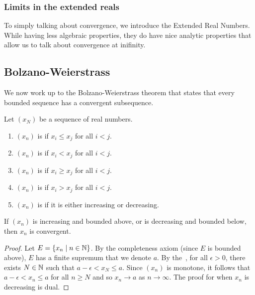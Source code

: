 \subsubsection{Limits in the extended reals}\label{sec:real-analysis:limits-extend-reals}
To simply talking about convergence, we introduce the Extended Real Numbers. While having less algebraic properties, they do have nice analytic properties that allow us to talk about convergence at inifinity.



\subsection{Bolzano-Weierstrass}\label{sec:real-analysis:bolzano-weierstrass}
We now work up to the Bolzano-Weierstrass theorem that states that every bounded sequence has a convergent subsequence.

\begin{definition}
  Let \((x_{N})\) be a sequence of real numbers.
  \begin{enumerate}
  \item \((x_{n})\) is  if \(x_{i} \leq x_{j}\) for all \(i < j\).
  \item \((x_{n})\) is  if \(x_{i} < x_{j}\) for all \(i < j\).
  \item \((x_{n})\) is  if \(x_{i} \geq x_{j}\) for all \(i < j\).
  \item \((x_{n})\) is  if \(x_{i} > x_{j}\) for all \(i < j\).
  \item \((x_{n})\) is  if it is either increasing or decreasing.
  \end{enumerate}
\end{definition}

\begin{theorem}\label{thm:real-analysis:monotone-convergence-theorem}
  If \((x_{n})\) is increasing and bounded above, or is decreasing and bounded below, then \(x_{n}\) is convergent.
\end{theorem}

\begin{proof}
  Let \(E = \{ x_{n} \mid n \in \mathbb{N}\}\). By the completeness axiom (since \(E\) is bounded above), \(E\) has a finite supremum that we denote \(a\). By the~, for all \(\epsilon > 0\), there exists \(N \in \mathbb{N}\) such that \(a - \epsilon < x_{N} \leq a\). Since \((x_{n})\) is monotone, it follows that \(a - \epsilon < x_{n} \leq a\) for all \(n \geq N\) and so \(x_{n} \to a\) as \(n \to \infty\). The proof for when \(x_{n}\) is decreasing is dual.
\end{proof}


